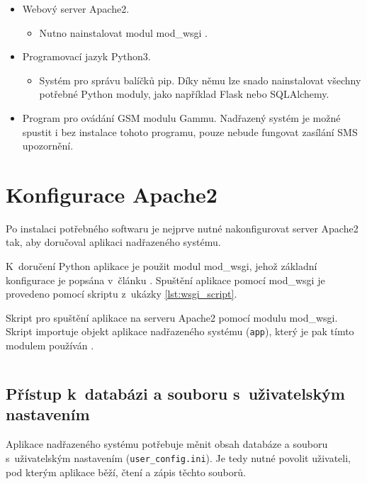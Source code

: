 \begin{itemize}
    \item Webový server Apache2.
    \begin{itemize}
        \item Nutno nainstalovat modul mod\_wsgi  \cite{mod_wsgi}.
    \end{itemize}
    \item Programovací jazyk Python3.
    \begin{itemize}
        \item Systém pro správu balíčků pip. Díky němu lze snado nainstalovat všechny potřebné Python moduly, jako například Flask nebo SQLAlchemy.
    \end{itemize}
    \item Program pro ovádání GSM modulu Gammu. Nadřazený systém je možné spustit i bez instalace tohoto programu, pouze nebude fungovat zasílání SMS upozornění.
\end{itemize}

\newpage

\section{Konfigurace Apache2}

Po instalaci potřebného softwaru je nejprve nutné nakonfigurovat server Apache2 tak, aby doručoval aplikaci nadřazeného systému. 

K~doručení Python aplikace je použit modul mod\_wsgi, jehož základní konfigurace je popsána v~článku \cite{flask_wsgi}. Spuštění aplikace pomocí mod\_wsgi je provedeno pomocí skriptu z~ukázky \ref{lst:wsgi_script}.

\begin{listing}[htbp]
\caption{\label{lst:wsgi_script} Skript pro spuštění aplikace na serveru Apache2 pomocí modulu mod\_wsgi. Skript importuje objekt aplikace nadřazeného systému (\texttt{app}), který je pak tímto modulem používán \cite{flask_wsgi}.}
\inputminted[bgcolor=codebg]{python}{source-samples/wsgi.py}
\end{listing}

\newpage

\subsection{Přístup k~databázi a souboru s~uživatelským nastavením}

Aplikace nadřazeného systému potřebuje měnit obsah databáze a souboru s~uživatelským nastavením (\texttt{user\_config.ini}). Je tedy nutné povolit uživateli, pod kterým aplikace běží, čtení a zápis těchto souborů. 

